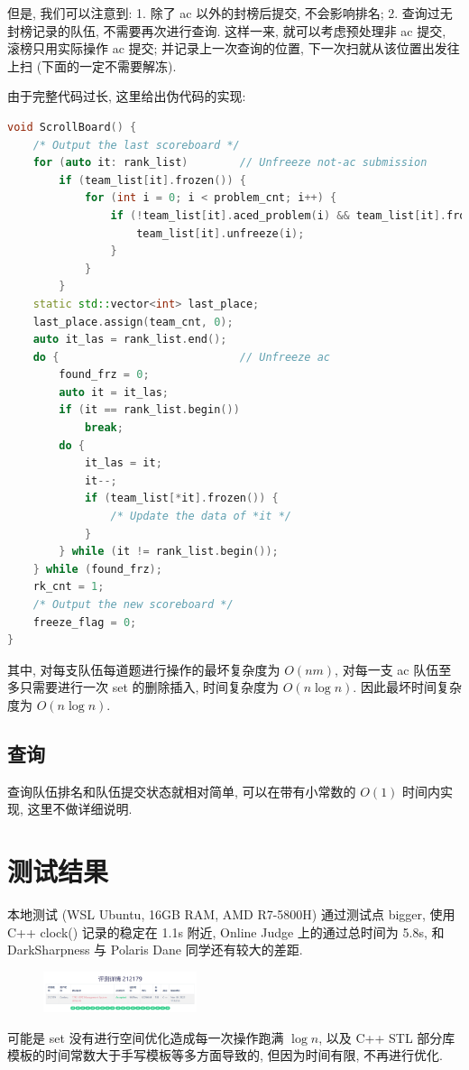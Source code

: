 \documentclass[UTF8, a4paper, 11pt]{ctexart}
\theoremstyle{definition}
\begin{document}
但是, 我们可以注意到: 1. 除了 ac 以外的封榜后提交, 不会影响排名; 2. 查询过无封榜记录的队伍, 不需要再次进行查询. 这样一来, 就可以考虑预处理非 ac 提交, 滚榜只用实际操作 ac 提交; 并记录上一次查询的位置, 下一次扫就从该位置出发往上扫 (下面的一定不需要解冻).

由于完整代码过长, 这里给出伪代码的实现:


\begin{lstlisting}[language=C++]
void ScrollBoard() {
    /* Output the last scoreboard */
    for (auto it: rank_list)        // Unfreeze not-ac submission    
        if (team_list[it].frozen()) {
            for (int i = 0; i < problem_cnt; i++) {
                if (!team_list[it].aced_problem(i) && team_list[it].frozen(i)) {
                    team_list[it].unfreeze(i);
                }
            }
        }
    static std::vector<int> last_place;
    last_place.assign(team_cnt, 0);
    auto it_las = rank_list.end();
    do {                            // Unfreeze ac
        found_frz = 0;
        auto it = it_las;
        if (it == rank_list.begin())
            break;
        do {
            it_las = it;
            it--;
            if (team_list[*it].frozen()) {
                /* Update the data of *it */
            }
        } while (it != rank_list.begin());
    } while (found_frz);
    rk_cnt = 1;
    /* Output the new scoreboard */
    freeze_flag = 0;
}
\end{lstlisting}

其中, 对每支队伍每道题进行操作的最坏复杂度为 $O(nm)$, 对每一支 ac 队伍至多只需要进行一次 set 的删除插入, 时间复杂度为 $O(n\log n)$. 因此最坏时间复杂度为 $O(n\log n)$.

\subsection{查询}

查询队伍排名和队伍提交状态就相对简单, 可以在带有小常数的 $O(1)$ 时间内实现, 这里不做详细说明.

\section{测试结果}

本地测试 (WSL Ubuntu, 16GB RAM, AMD R7-5800H) 通过测试点 bigger, 使用 C++ clock() 记录的稳定在 1.1s 附近, Online Judge 上的通过总时间为 5.8s, 和 DarkSharpness 与 Polaris Dane 同学还有较大的差距.

\begin{figure}[H] 
    \centering
    \includegraphics[width=0.4\textwidth]{1.png}
\end{figure}

可能是 set 没有进行空间优化造成每一次操作跑满 $\log n$, 以及 C++ STL 部分库模板的时间常数大于手写模板等多方面导致的, 但因为时间有限, 不再进行优化.
\end{document}

